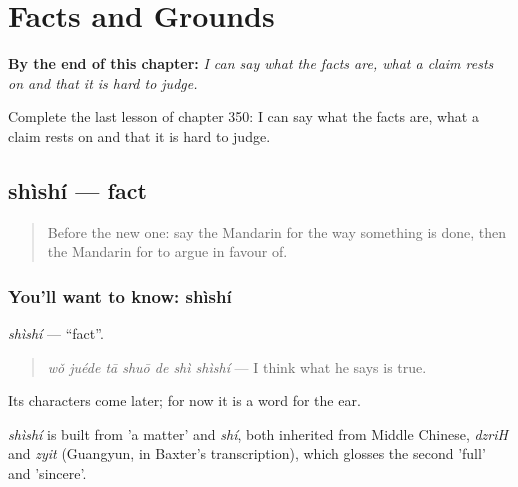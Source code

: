 
\chapter{Facts and Grounds}
\label{ch:zh-facts-and-grounds}

\begin{chapteropening}
\textbf{By the end of this chapter:} \emph{I can say what the facts are, what a claim rests on and that it is hard to judge.}

Complete the last lesson of chapter 350: I can say what the facts are, what a claim rests on and that it is hard to judge.
\end{chapteropening}

\section[shìshí]{shìshí — fact}

\label{lesson:ZH-C350-shishi}



\begin{quote}
Before the new one: say the Mandarin for the way something is done, then the Mandarin for to argue in favour of.
\end{quote}

\subsection*{You'll want to know: shìshí}
\emph{shìshí} — \textquotedblleft{}fact\textquotedblright{}.

\begin{quote}
\emph{wǒ juéde tā shuō de shì shìshí} — I think what he says is true.
\end{quote}

Its characters come later; for now it is a word for the ear.

\begin{cousinweb}
\emph{shìshí} is built from  'a matter' and \emph{shí}, both inherited from Middle Chinese, \emph{dzriH} and \emph{zyit} (Guangyun, in Baxter's transcription), which glosses the second 'full' and 'sincere'.
\end{cousinweb}

